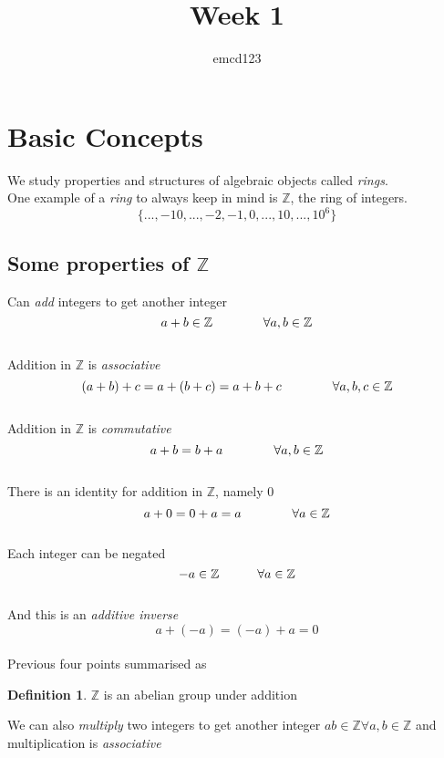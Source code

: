\documentclass{article}
\title{Week 1}
\author{emcd123}
\theoremstyle{plain}
\theoremstyle{definition}
\newtheorem{defn}{Definition}[section]
\theoremstyle{remark}
\begin{document}
\section{Basic Concepts}

We study properties and structures of algebraic objects called \textit{rings}.\\
One example of a \textit{ring} to always keep in mind is $\mathbb{Z}$,
the ring of integers.
\[\{...,-10,...,-2,-1,0,...,10,...,10^6\}\]

\subsection{Some properties of $\mathbb{Z}$}

Can \textit{add} integers to get another integer
\[ a + b \in \mathbb{Z} \hspace{40px} \forall a,b \in \mathbb{Z}\]\\
Addition in $\mathbb{Z}$ is \textit{associative}
\begin{equation}
	(a+b) + c = a + ( b + c ) = a + b + c \hspace{40px} \forall a,b,c \in \mathbb{Z}
\end{equation} \\
Addition in $\mathbb{Z}$ is \textit{commutative}
\begin{equation}
	a+b =  b + a \hspace{40px} \forall a,b \in \mathbb{Z}
\end{equation} \\
There is an identity for addition in $\mathbb{Z}$, namely $0$
\begin{equation}
	a + 0 = 0 + a = a \hspace{40px} \forall a \in \mathbb{Z}
\end{equation}\\
Each integer can be negated
\[ -a \in \mathbb{Z} \hspace{30px} \forall a \in \mathbb{Z}\]\\
And this is an \textit{additive inverse}
\begin{equation}
	a + (-a) = (-a) + a = 0
\end{equation}\\
Previous four points summarised as
\begin{defn}
	 $\mathbb{Z}$ is an abelian group under addition
\end{defn}
We can also \textit{multiply} two integers to get another integer
$ab \in \mathbb{Z} \forall a,b \in \mathbb{Z}$ and multiplication is \textit{associative}
\end{document}
